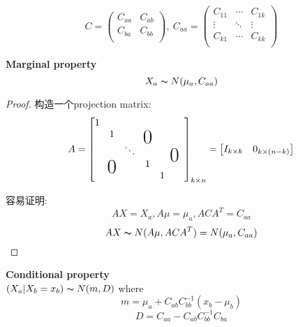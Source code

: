 \documentclass{article}
\begin{document}
$$
C =
\begin{pmatrix}
  C_{aa} & C_{ab} \\
  C_{ba} & C_{bb} \\
\end{pmatrix}
,
\
C_{aa} =
\begin{pmatrix}
  C_{11} & \cdots & C_{1k} \\
  \vdots & \ddots & \vdots \\
  C_{k1} & \cdots & C_{kk} \\
\end{pmatrix}
$$
\begin{fact}
\textbf{Marginal property}\\
$$X_a \thicksim{N}(\mu_a, C_{aa})$$
\end{fact}
\begin{proof}
构造一个projection matrix:
\newcommand\bigzero{\makebox(0,0){\text{\huge0}}}
$$
A =
\begin{bmatrix}
    1 &  &  &  &  &&\\
 	  & 1 &  & \bigzero & &&\\
      &   & \ddots &  &  &\bigzero& \\
      & \bigzero & & 1 &  &&\\
      &   &   & & 1 &&\\
\end{bmatrix}_{k \times n}
=
\begin{bmatrix}
	I_{k \times k} & 0_{k \times (n-k)}
\end{bmatrix}
$$

容易证明: $$AX = {X_a}, A\mu = \mu_a, ACA^T = C_{aa}$$
$$AX \thicksim{N}(A\mu, ACA^T) = N(\mu_a, C_{aa})$$
\end{proof}

\begin{fact}
\textbf{Conditional property}\\
$(X_a|X_b = x_b) \thicksim{N}(m, D)$ where
$$m = \mu_a + C_{ab} C_{bb}^{-1}(x_b - \mu_b)$$
$$D = C_{aa} - C_{ab} C_{bb}^{-1} C_{ba}$$
\end{fact}
\end{document}
